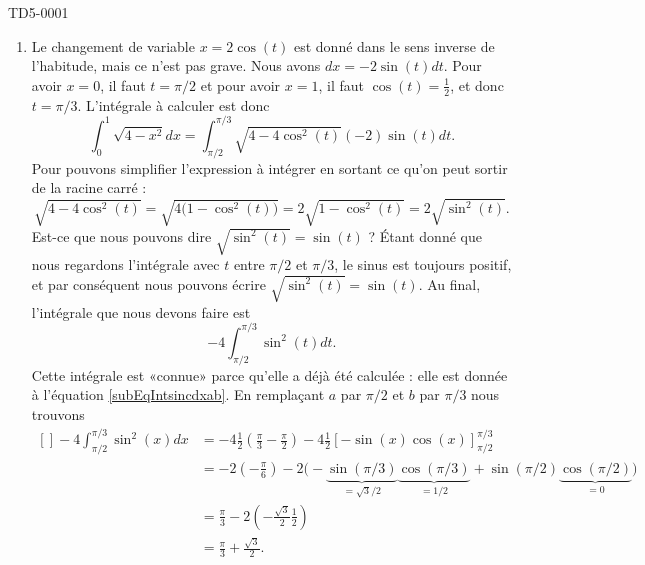 \begin{corrige}{TD5-0001}
\begin{enumerate}
		\item
			Le changement de variable $x=2\cos(t)$ est donné dans le sens inverse de l'habitude, mais ce n'est pas grave. Nous avons $dx=-2\sin(t)dt$. Pour avoir $x=0$, il faut $t=\pi/2$ et pour avoir $x=1$, il faut $\cos(t)=\frac{ 1 }{2}$, et donc $t=\pi/3$. L'intégrale à calculer est donc
			\begin{equation}
				\int_0^1\sqrt{4-x^2}dx=\int_{\pi/2}^{\pi/3}\sqrt{4-4\cos^2(t)}(-2)\sin(t)dt.
			\end{equation}
			Pour pouvons simplifier l'expression à intégrer en sortant ce qu'on peut sortir de la racine carré :
			\begin{equation}
				\sqrt{4-4\cos^2(t)}=\sqrt{4\big( 1-\cos^2(t) \big)}=2\sqrt{1-\cos^2(t)}=2\sqrt{\sin^2(t)}.
			\end{equation}
			Est-ce que nous pouvons dire $\sqrt{\sin^2(t)}=\sin(t)$ ? Étant donné que nous regardons l'intégrale avec $t$ entre $\pi/2$ et $\pi/3$, le sinus est toujours positif, et par conséquent nous pouvons écrire $\sqrt{\sin^2(t)}=\sin(t)$. Au final, l'intégrale que nous devons faire est
			\begin{equation}
				-4\int_{\pi/2}^{\pi/3}\sin^2(t)dt.
			\end{equation}
			Cette intégrale est «connue» parce qu'elle a déjà été calculée : elle est donnée à l'équation \eqref{subEqIntsincdxab}. En remplaçant $a$ par $\pi/2$ et $b$ par $\pi/3$ nous trouvons
			\begin{equation}
				\begin{aligned}[]
					-4\int_{\pi/2}^{\pi/3}\sin^2(x)dx&=-4\frac{ 1 }{2}\left( \frac{ \pi }{3}-\frac{ \pi }{ 2 } \right)-4\frac{ 1 }{2}\left[ -\sin(x)\cos(x) \right]_{\pi/2}^{\pi/3}\\
					&=-2\left( -\frac{ \pi }{ 6 } \right)-2\Big( -\underbrace{\sin(\pi/3)}_{=\sqrt{3}/2}\underbrace{\cos(\pi/3)}_{=1/2}+\sin(\pi/2)\underbrace{\cos(\pi/2)}_{=0} \Big)\\
					&=\frac{ \pi }{ 3 }-2\left( -\frac{ \sqrt{3} }{2}\frac{ 1 }{2} \right)\\
					&=\frac{ \pi }{ 3 }+\frac{ \sqrt{3} }{ 2 }.
				\end{aligned}
			\end{equation}
	\end{enumerate}

\end{corrige}
